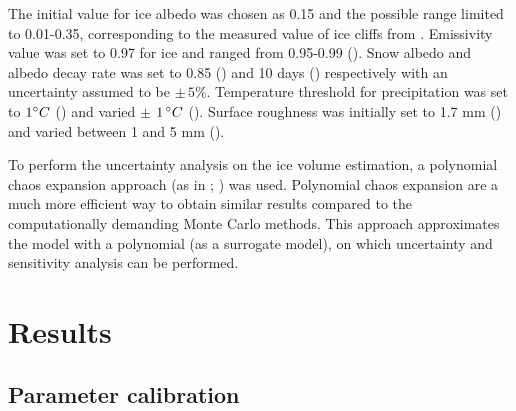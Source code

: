 \documentclass[utf8]{frontiersSCNS} %
\begin{document}
The initial value for ice albedo was chosen as 0.15 and the possible range limited to 0.01-0.35, corresponding to the
measured value of ice cliffs from \cite{steiner_2015}. Emissivity value was set to 0.97 for ice and ranged from
0.95-0.99 (\cite{steiner_2015}). Snow albedo and albedo decay rate was set to 0.85 (\cite{CuffeyPaterson_2010}) and 10
days (\cite{Schmidt_2017}) respectively with an uncertainty assumed to be $\pm \,5 \%$. Temperature threshold for
precipitation was set to $1 \degree C$ (\cite{FujitaAgeta_2000}) and varied $\pm$ $1\,\degree C$ (\cite{Zhou_2010}).
Surface roughness was initially set to 1.7 mm (\cite{CuffeyPaterson_2010}) and varied between 1 and 5 mm
(\cite{BrockWillisSharp_2006}). 


To perform the uncertainty analysis on the ice volume estimation, a polynomial chaos expansion approach (as in
\cite{uncertainpy_2018}; \cite{Xiu_2005}) was used. Polynomial chaos expansion are a much more efficient way to obtain
similar results compared to the computationally demanding Monte Carlo methods. This approach approximates the model with
a polynomial (as a surrogate model), on which uncertainty and sensitivity analysis can be performed. 

\section{Results} 
\subsection{Parameter calibration}
% 
\end{document}
